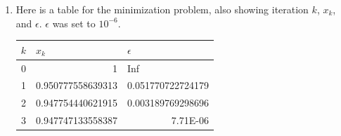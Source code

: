 \documentclass[12pt]{extarticle}
\begin{document}
\begin{enumerate}
\begin{center}
\end{center}

\item Here is a table for the minimization problem, also showing iteration $k$, $x_k$, and $\epsilon$. $\epsilon$ was set to $10^{-6}$.
\begin{center}
\begin{adjustbox}{width=.45\columnwidth,center}
\begin{tabular}{|r|r|r|}
\hline
\multicolumn{1}{|l|}{$k$} & \multicolumn{1}{l|}{$x_k$} & \multicolumn{1}{l|}{$\epsilon$} \\ \hline
0 & 1 & \multicolumn{1}{l|}{Inf} \\ \hline
1 & 0.950777558639313 & 0.051770722724179 \\ \hline
2 & 0.947754440621915 & 0.003189769298696 \\ \hline
3 & 0.947747133558387 & 7.71E-06 \\ \hline
\end{tabular}
\label{}
\end{adjustbox}
\end{center}
\end{enumerate}

\newpage
\end{document}
